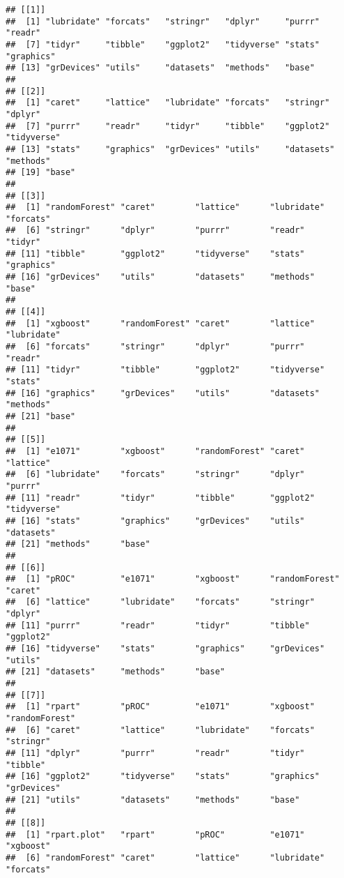 \documentclass[
]{article}
\begin{document}
\begin{verbatim}
## [[1]]
##  [1] "lubridate" "forcats"   "stringr"   "dplyr"     "purrr"     "readr"    
##  [7] "tidyr"     "tibble"    "ggplot2"   "tidyverse" "stats"     "graphics" 
## [13] "grDevices" "utils"     "datasets"  "methods"   "base"     
## 
## [[2]]
##  [1] "caret"     "lattice"   "lubridate" "forcats"   "stringr"   "dplyr"    
##  [7] "purrr"     "readr"     "tidyr"     "tibble"    "ggplot2"   "tidyverse"
## [13] "stats"     "graphics"  "grDevices" "utils"     "datasets"  "methods"  
## [19] "base"     
## 
## [[3]]
##  [1] "randomForest" "caret"        "lattice"      "lubridate"    "forcats"     
##  [6] "stringr"      "dplyr"        "purrr"        "readr"        "tidyr"       
## [11] "tibble"       "ggplot2"      "tidyverse"    "stats"        "graphics"    
## [16] "grDevices"    "utils"        "datasets"     "methods"      "base"        
## 
## [[4]]
##  [1] "xgboost"      "randomForest" "caret"        "lattice"      "lubridate"   
##  [6] "forcats"      "stringr"      "dplyr"        "purrr"        "readr"       
## [11] "tidyr"        "tibble"       "ggplot2"      "tidyverse"    "stats"       
## [16] "graphics"     "grDevices"    "utils"        "datasets"     "methods"     
## [21] "base"        
## 
## [[5]]
##  [1] "e1071"        "xgboost"      "randomForest" "caret"        "lattice"     
##  [6] "lubridate"    "forcats"      "stringr"      "dplyr"        "purrr"       
## [11] "readr"        "tidyr"        "tibble"       "ggplot2"      "tidyverse"   
## [16] "stats"        "graphics"     "grDevices"    "utils"        "datasets"    
## [21] "methods"      "base"        
## 
## [[6]]
##  [1] "pROC"         "e1071"        "xgboost"      "randomForest" "caret"       
##  [6] "lattice"      "lubridate"    "forcats"      "stringr"      "dplyr"       
## [11] "purrr"        "readr"        "tidyr"        "tibble"       "ggplot2"     
## [16] "tidyverse"    "stats"        "graphics"     "grDevices"    "utils"       
## [21] "datasets"     "methods"      "base"        
## 
## [[7]]
##  [1] "rpart"        "pROC"         "e1071"        "xgboost"      "randomForest"
##  [6] "caret"        "lattice"      "lubridate"    "forcats"      "stringr"     
## [11] "dplyr"        "purrr"        "readr"        "tidyr"        "tibble"      
## [16] "ggplot2"      "tidyverse"    "stats"        "graphics"     "grDevices"   
## [21] "utils"        "datasets"     "methods"      "base"        
## 
## [[8]]
##  [1] "rpart.plot"   "rpart"        "pROC"         "e1071"        "xgboost"     
##  [6] "randomForest" "caret"        "lattice"      "lubridate"    "forcats"     

\end{verbatim}
\end{document}
